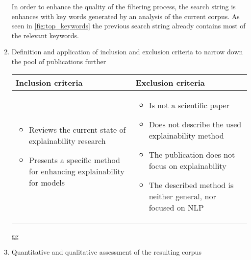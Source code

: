 \begin{enumerate}
	In order to enhance the quality of the filtering process, the search string is enhances with key words generated by an analysis of the current corpus. As seen in \autoref{fig:top_keywords} the previous search string already contains most of the relevant keywords.
	
	\item Definition and application of inclusion and exclusion criteria to narrow down the pool of publications further
	
	\begin{center}
		\begin{tabular}{  p{5cm} | p{5cm} }
			Inclusion criteria & Exclusion criteria  \\ \hline
			
			\begin{itemize}
				\item Reviews the current state of explainability research
				\item Presents a specific method for enhancing explainability for models
			\end{itemize}
		
			&
			
			\begin{itemize}
				\item Is not a scientific paper
				\item Does not describe the used explainability method
				\item The publication does not focus on explainability
				\item The described method is neither general, nor focused on NLP
			\end{itemize}			
		\end{tabular}
	\end{center}
	
	gg
	\item Quantitative and qualitative assessment of the resulting corpus
\end{enumerate}

